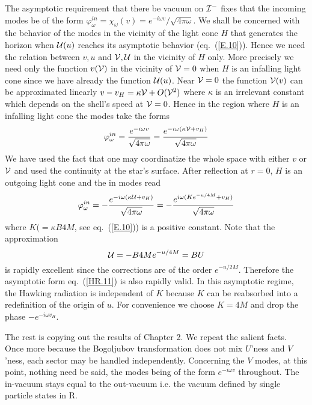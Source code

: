 \documentclass[12pt,oneside]{report}
\begin{document}
The asymptotic requirement that there be vacuum on ${\cal I}^-$
fixes that the incoming modes be of the form
$\varphi_\omega^{in}= \chi_\omega (v) = e^{-i\omega v}/ \sqrt {4 \pi \omega}$. 
We shall be concerned with the behavior of the modes in the vicinity
of the light cone $H$ that generates the horizon when
${\cal{U}}(u)$ reaches its asymptotic 
behavior (eq.~(\ref{E.10})). Hence we need the
relation between $v,u$ and $ {\cal{V}} , {\cal{U}} $ in the vicinity of $H$
 only. More precisely we
need only the function $v( {\cal{V}} )$ in the vicinity of 
$ {\cal{V}} =0$ when $H$ is an infalling light cone since 
we have already the function ${\cal{U}}(u)$. 
 Near $ {\cal{V}} =0$ the function $ {\cal{V}}  (v)$ can be approximated
linearly $v - v_H = \kappa  {\cal{V}}  + O( {\cal{V}} ^2)$  where $\kappa$ is an
irrelevant constant which depends on the shell's speed at $ {\cal{V}} =0$.
Hence in the region where $H$ is an infalling light cone
the modes take the forms
\begin{equation}
\varphi_\omega ^{in}=
{e^{-i \omega v}
 \over \sqrt{4 \pi \omega}}
= {e^{-i \omega (\kappa  {\cal{V}} +v_H)} 
\over \sqrt{4 \pi \omega}} 
\end{equation}
We have used the fact 
that one may coordinatize the whole space with either $v$ or ${\cal{V}}$ 
and used the 
continuity at the star's surface.
After reflection at $r=0$, $H$ is an outgoing light cone and the in modes  
read 
\begin{equation}
\varphi_\omega ^{in}
 =-{e^{-i \omega (\kappa  {\cal{U}} +v_H)} 
\over \sqrt{4 \pi \omega}} 
 =  -
{e^{i \omega ( Ke^{-u/4M} + v_H)}
 \over \sqrt{4 \pi \omega}}
\label{HR.11}
\end{equation}
where $K(= \kappa  B 4M$, see eq.~(\ref{E.10})) is a positive constant. 
Note that the approximation \begin{equation}
{\cal{U}} =- B 4M e^{-u/4M}= BU
\label{HR.11b}
\end{equation}
 is rapidly excellent
since the corrections are of the order $e^{-u/2M}$. 
Therefore the asymptotic form eq.~(\ref{HR.11}) is 
also rapidly valid. In this asymptotic regime, 
the Hawking radiation is independent of $K$ because $K$ 
can be reabsorbed into a redefinition of the origin of $u$.
For convenience we choose $ K = 4M $ and drop the phase
$-e^{-i \omega v_H}$. 

The rest is copying out the results of Chapter 2. We repeat the
salient facts. Once more because the
Bogoljubov transformation does not mix $U$'ness and $V$'ness, 
each sector may be
handled independently. Concerning the $V$ modes, at this point, nothing need be
said, the modes being of the form $e^{-i \omega v}$ throughout. The in-vacuum
stays equal to the out-vacuum i.e. the vacuum defined by single particle
states in R.
\end{document}
